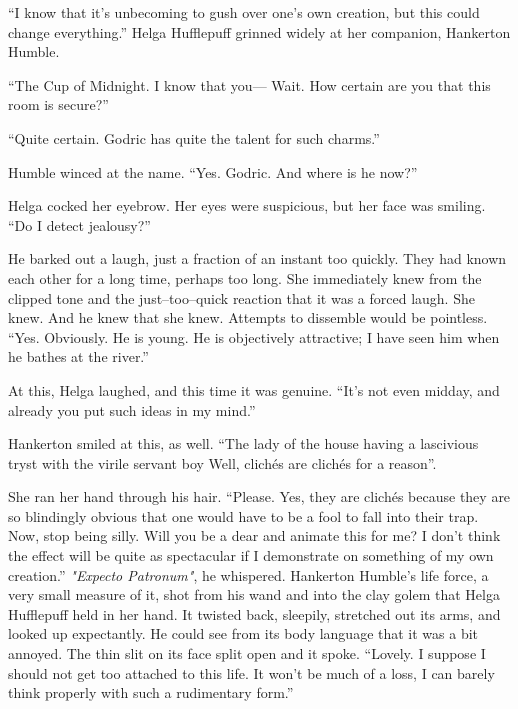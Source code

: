 \simpleline
\pagebreak
{}

“I know that it’s unbecoming to gush over one’s own creation, but this could change everything.” Helga Hufflepuff grinned widely at her companion, Hankerton Humble.

“The Cup of Midnight{\el}. I know that you\mbox{---} Wait. How certain are you that this room is secure?”

“Quite certain. Godric has quite the talent for such charms.”

Humble winced at the name. “Yes. Godric. And where is he now?”

Helga cocked her eyebrow. Her eyes were suspicious, but her face was smiling. “Do I detect jealousy?”

He barked out a laugh, just a fraction of an instant too quickly. They had known each other for a long time, perhaps too long. She immediately knew from the clipped tone and the just\mbox{--}too\mbox{--}quick reaction that it was a forced laugh. She knew. And he knew that she knew. Attempts to dissemble would be pointless. “Yes. Obviously. He is young. He is objectively attractive; I have seen him when he bathes at the river.”

At this, Helga laughed, and this time it was genuine. “It’s not even midday, and already you put such ideas in my mind.”

Hankerton smiled at this, as well. “The lady of the house having a lascivious tryst with the virile servant boy{\el} Well, clichés are clichés for a reason”.

She ran her hand through his hair. “Please. Yes, they are clichés because they are so blindingly obvious that one would have to be a fool to fall into their trap. Now, stop being silly. Will you be a dear and animate this for me? I don’t think the effect will be quite as spectacular if I demonstrate on something of my own creation.”
\SmallVSpace
\emph{"Expecto Patronum"}, he whispered. Hankerton Humble’s life force, a very small measure of it, shot from his wand and into the clay golem that Helga Hufflepuff held in her hand. It twisted back, sleepily, stretched out its arms, and looked up expectantly. He could see from its body language that it was a bit annoyed. The thin slit on its face split open and it spoke.
\SmallVSpace
“Lovely. I suppose I should not get too attached to this life. It won’t be much of a loss, I can barely think properly with such a rudimentary form.”

